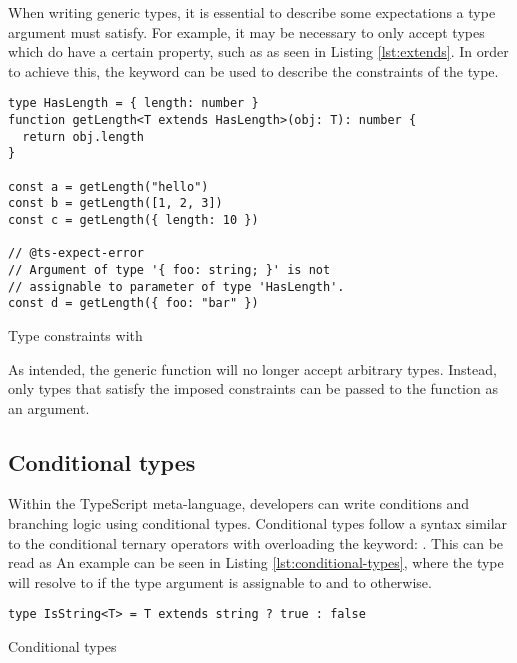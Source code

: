 When writing generic types, it is essential to describe some expectations a type argument must satisfy. For example, it may be necessary to only accept types which do have a certain property, such as  as seen in Listing \ref{lst:extends}. In order to achieve this, the  keyword can be used to describe the constraints of the type.

\begin{listing}[ht]
  \begin{verbatim}
type HasLength = { length: number }
function getLength<T extends HasLength>(obj: T): number {
  return obj.length
}

const a = getLength("hello")
const b = getLength([1, 2, 3])
const c = getLength({ length: 10 })

// @ts-expect-error 
// Argument of type '{ foo: string; }' is not 
// assignable to parameter of type 'HasLength'.
const d = getLength({ foo: "bar" })
\end{verbatim}
  \caption{Type constraints with }\label{lst:extends}
\end{listing}

As intended, the generic  function will no longer accept arbitrary types. Instead, only types that satisfy the imposed constraints can be passed to the function as an argument.

\clearpage

\subsection{Conditional types}

Within the TypeScript meta-language, developers can write conditions and branching logic using conditional types. Conditional types follow a syntax similar to the conditional ternary operators with overloading the  keyword: . This can be read as  An example can be seen in Listing \ref{lst:conditional-types}, where the  type will resolve to  if the type argument  is assignable to  and to  otherwise.

\begin{listing}[ht]
  \begin{verbatim}
type IsString<T> = T extends string ? true : false
\end{verbatim}
  \caption{Conditional types}\label{lst:conditional-types}
\end{listing}

